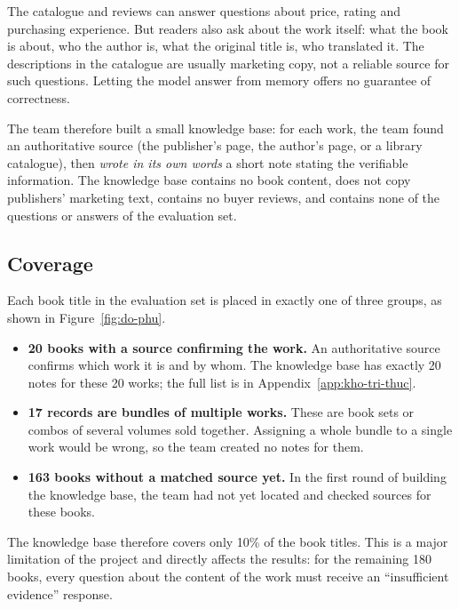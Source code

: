 The catalogue and reviews can answer questions about price, rating and purchasing experience. But readers also ask about the work itself: what the book is about, who the author is, what the original title is, who translated it. The descriptions in the catalogue are usually marketing copy, not a reliable source for such questions. Letting the model answer from memory offers no guarantee of correctness.

The team therefore built a small knowledge base: for each work, the team found an authoritative source (the publisher's page, the author's page, or a library catalogue), then \emph{wrote in its own words} a short note stating the verifiable information. The knowledge base contains no book content, does not copy publishers' marketing text, contains no buyer reviews, and contains none of the questions or answers of the evaluation set.

\subsection{Coverage}

Each book title in the evaluation set is placed in exactly one of three groups, as shown in Figure~\ref{fig:do-phu}.


\begin{itemize}
    \item \textbf{20 books with a source confirming the work.} An authoritative source confirms which work it is and by whom. The knowledge base has exactly 20 notes for these 20 works; the full list is in Appendix~\ref{app:kho-tri-thuc}.
    \item \textbf{17 records are bundles of multiple works.} These are book sets or combos of several volumes sold together. Assigning a whole bundle to a single work would be wrong, so the team created no notes for them.
    \item \textbf{163 books without a matched source yet.} In the first round of building the knowledge base, the team had not yet located and checked sources for these books.
\end{itemize}

The knowledge base therefore covers only 10\% of the book titles. This is a major limitation of the project and directly affects the results: for the remaining 180 books, every question about the content of the work must receive an ``insufficient evidence'' response.

